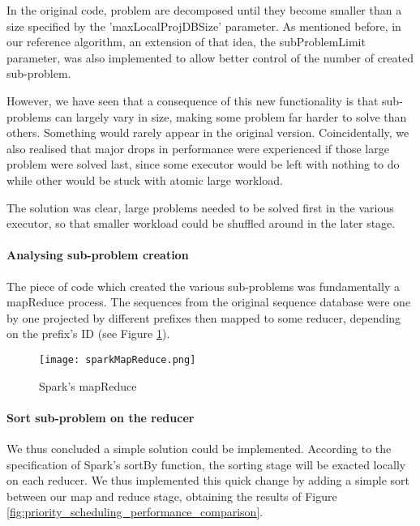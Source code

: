 \documentclass{eplmastersthesis}
\begin{document}
In the original code, problem are decomposed until they become smaller than a size specified by the 'maxLocalProjDBSize' parameter. As mentioned before, in our reference algorithm, an extension of that idea, the subProblemLimit parameter, was also implemented to allow better control of the number of created sub-problem. \newline

However, we have seen that a consequence of this new functionality is that sub-problems can largely vary in size, making some problem far harder to solve than others. Something would rarely appear in the original version. Coincidentally, we also realised that major drops in performance were experienced if those large problem were solved last, since some executor would be left with nothing to do while other would be stuck with atomic large workload.
\newline

The solution was clear, large problems needed to be solved first in the various executor, so that smaller workload could be shuffled around in the later stage. 

\paragraph{Analysing sub-problem creation}

The piece of code which created the various sub-problems was fundamentally a mapReduce process. The sequences from the original sequence database were one by one projected by different prefixes then mapped to some reducer, depending on the prefix's ID (see Figure \ref{fig:sparkMapReduce}). \newline

\begin{figure}[h]
  \centering
  \texttt{[image: sparkMapReduce.png]}
  \caption{Spark's mapReduce}
  \label{fig:sparkMapReduce}
\end{figure}

\paragraph{Sort sub-problem on the reducer}

We thus concluded a simple solution could be implemented. According to the specification of Spark's sortBy function, the sorting stage will be exacted locally on each reducer. We thus implemented this quick change by adding a simple sort between our map and reduce stage, obtaining the results of Figure \ref{fig:priority_scheduling_performance_comparison}. \newline
\end{document}
